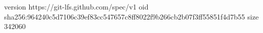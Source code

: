 version https://git-lfs.github.com/spec/v1
oid sha256:964240c5d7106c39ef83cc547657c8ff8022f9b266cb2b07f3ff55851f4d7b55
size 342060
